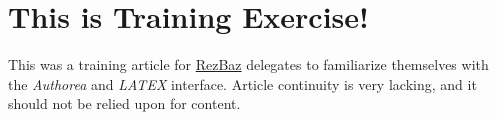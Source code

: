 \section{This is Training Exercise!}
This was a training article for \href{http://melbourne.resbaz.edu.au/}{RezBaz} delegates to familiarize themselves with the \textit{Authorea} and \textit{LATEX} interface. 
Article continuity is very lacking, and it should not be relied upon for content. 